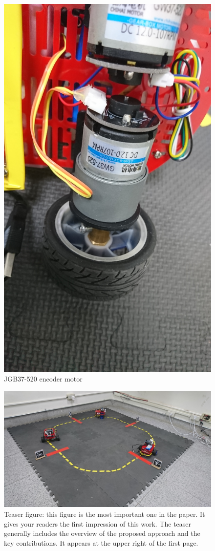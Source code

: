 \documentclass[letterpaper, 10 pt, conference]{ieeeconf}  %
\begin{document}
\begin{figure}[h] %
\includegraphics[width=0.8\columnwidth]{JGB37-520}
\centering
\caption{JGB37-520 encoder motor}
 \label{figure:JGB37-520}
\end{figure}

\begin{figure}[t] %
\includegraphics[width=0.8\columnwidth]{map}
\centering
\caption{Teaser figure: this figure is the most important one in the paper. It gives your readers the first impression of this work. The teaser generally includes the overview of the proposed approach and the key contributions. It appears at the upper right of the first page.}
\label{figure:map}
\end{figure}
\end{document}
